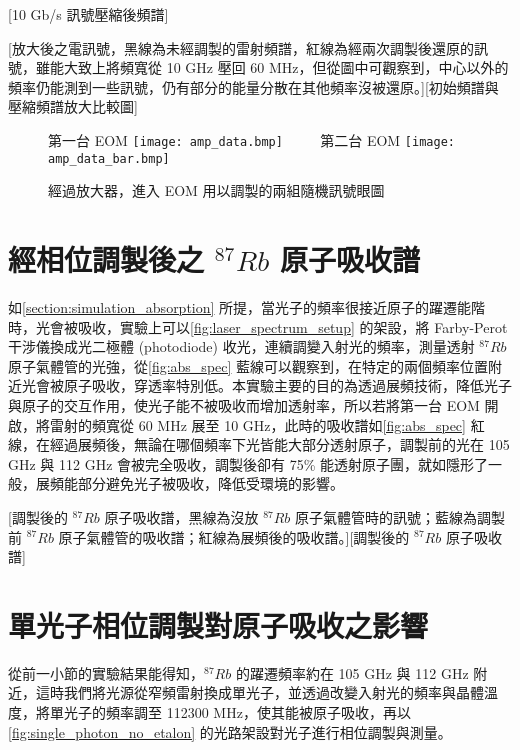\documentclass[class=NCU_thesis, crop=false]{standalone}
\begin{document}
[10 Gb/s 訊號壓縮後頻譜]

[放大後之電訊號，黑線為未經調製的雷射頻譜，紅線為經兩次調製後還原的訊號，雖能大致上將頻寬從 10 GHz 壓回 60 MHz，但從圖中可觀察到，中心以外的頻率仍能測到一些訊號，仍有部分的能量分散在其他頻率沒被還原。][初始頻譜與壓縮頻譜放大比較圖]

\begin{figure}[!hbt]
    \centering
    \subcaptionbox
        {第一台 EOM 
        \label{fig:subfig_fig1}}
        {\texttt{[image: amp\_data.bmp]}}
    ~~~~
    \subcaptionbox
        {第二台 EOM
        \label{fig:subfig_fig2}}
        {\texttt{[image: amp\_data\_bar.bmp]}}
    \caption{經過放大器，進入 EOM 用以調製的兩組隨機訊號眼圖}
    \label{fig:amplified_signal}
\end{figure}

\section{經相位調製後之 $^{87}Rb$ 原子吸收譜}

如\cref{section:simulation_absorption} 所提，當光子的頻率很接近原子的躍遷能階時，光會被吸收，實驗上可以\cref{fig:laser_spectrum_setup} 的架設，將 Farby-Perot 干涉儀換成光二極體 (photodiode) 收光，連續調變入射光的頻率，測量透射 $^{87}Rb$ 原子氣體管的光強，從\cref{fig:abs_spec} 藍線可以觀察到，在特定的兩個頻率位置附近光會被原子吸收，穿透率特別低。本實驗主要的目的為透過展頻技術，降低光子與原子的交互作用，使光子能不被吸收而增加透射率，所以若將第一台 EOM 開啟，將雷射的頻寬從 60 MHz 展至 10 GHz，此時的吸收譜如\cref{fig:abs_spec} 紅線，在經過展頻後，無論在哪個頻率下光皆能大部分透射原子，調製前的光在 105 GHz 與 112 GHz 會被完全吸收，調製後卻有 75\% 能透射原子團，就如隱形了一般，展頻能部分避免光子被吸收，降低受環境的影響。

[調製後的 $^{87}Rb$ 原子吸收譜，黑線為沒放 $^{87}Rb$ 原子氣體管時的訊號；藍線為調製前 $^{87}Rb$ 原子氣體管的吸收譜；紅線為展頻後的吸收譜。][調製後的 $^{87}Rb$ 原子吸收譜]

\section{單光子相位調製對原子吸收之影響}
從前一小節的實驗結果能得知，$^{87}Rb$ 的躍遷頻率約在 105 GHz 與 112 GHz 附近，這時我們將光源從窄頻雷射換成單光子，並透過改變入射光的頻率與晶體溫度，將單光子的頻率調至 112300 MHz，使其能被原子吸收，再以\cref{fig:single_photon_no_etalon} 的光路架設對光子進行相位調製與測量。
\end{document}

